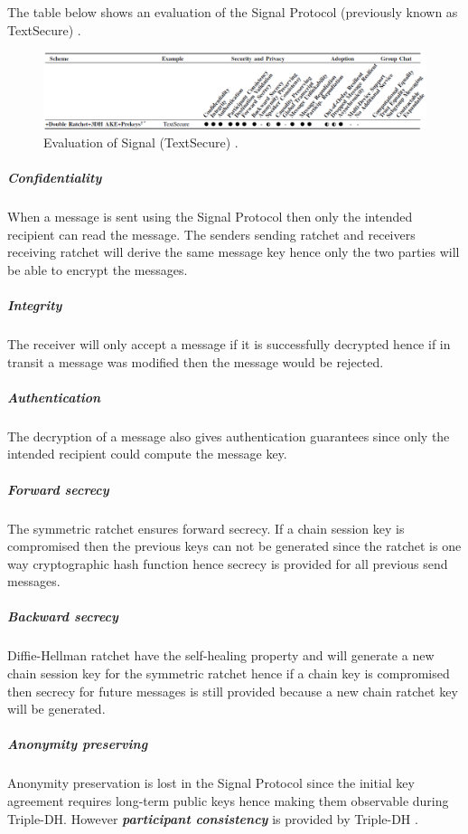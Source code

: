 The table below shows an evaluation of the Signal Protocol (previously known as TextSecure) \cite{sok}. 

\begin{figure}[H]
	\hspace*{-1.7cm} 
	\centering
	\includegraphics[width=16cm]{figures/framework_signal.png}
	\caption{Evaluation of Signal (TextSecure) \cite{sok}.}
	\label{fig:framework_signal}
\end{figure}




\subparagraph{Confidentiality} When a message is sent using the Signal Protocol then only the intended recipient can read the message. The senders sending ratchet and receivers receiving ratchet will derive the same message key hence only the two parties will be able to encrypt the messages. 

\subparagraph{Integrity} The receiver will only accept a message if it is successfully decrypted hence if in transit a message was modified then the message would be rejected.

\subparagraph{Authentication} The decryption of a message also gives authentication guarantees since only the intended recipient could compute the message key.

\subparagraph{Forward secrecy} The symmetric ratchet ensures forward secrecy. If a chain session key is compromised then the previous keys can not be generated since the ratchet is one way cryptographic hash function hence secrecy is provided for all previous send messages.  

\subparagraph{Backward secrecy} Diffie-Hellman ratchet have the self-healing property and will generate a new chain session key for the symmetric ratchet hence if a chain key is compromised then secrecy for future messages is still provided because a new chain ratchet key will be generated.

\subparagraph{Anonymity preserving}

Anonymity preservation is lost in the Signal Protocol since the initial key agreement requires long-term public keys hence making them observable during Triple-DH. However \textbf{\emph{participant consistency}} is provided by Triple-DH \cite{sok}. %

